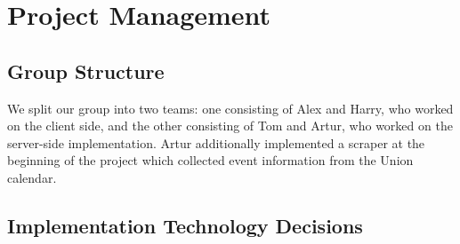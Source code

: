 \documentclass[11pt]{article}
\begin{document}
\section {Project Management}	

\subsection {Group Structure}

We split our group into two teams: one consisting of Alex and Harry, who worked on the client side, and the other consisting of Tom and Artur, who worked on the server-side implementation. Artur additionally implemented a scraper at the beginning of the project which collected event information from the Union calendar.

\subsubsection {}

\subsection {Implementation Technology Decisions}
\end{document}
